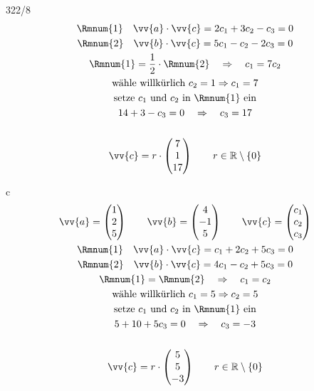\begin{exercise}{322/8}
\begin{gather*}
    \text{\Rmnum{1}} \quad \vv{a} \cdot \vv{c} = 2c_1 + 3c_2 - c_3 = 0 \\
    \text{\Rmnum{2}} \quad \vv{b} \cdot \vv{c} = 5c_1 - c_2 - 2c_3 = 0 \\
    \text{\Rmnum{1}} = \frac{1}{2} \cdot \text{\Rmnum{2}} \quad\Rightarrow\quad c_1 = 7c_2 \\
    \text{wähle willkürlich } c_2 = 1 \Rightarrow c_1 = 7 \\
    \text{setze $c_1$ und $c_2$ in \Rmnum{1} ein} \\
    14 + 3 - c_3 = 0 \quad\Rightarrow\quad c_3 = 17 \\\\
    \vv{c} = r \cdot \begin{pmatrix}7 \\ 1 \\ 17\end{pmatrix} \qquad r \in \mathbb{R} \setminus \{0\}
  \end{gather*}
  \item [c]
  \begin{gather*}
    \vv{a} = \begin{pmatrix}1 \\ 2 \\ 5\end{pmatrix} \qquad \vv{b} = \begin{pmatrix}4 \\ -1 \\ 5\end{pmatrix} \qquad \vv{c} = \begin{pmatrix}c_1 \\ c_2 \\ c_3\end{pmatrix} \\
    \text{\Rmnum{1}} \quad \vv{a} \cdot \vv{c} = c_1 + 2c_2 + 5c_3 = 0 \\
    \text{\Rmnum{2}} \quad \vv{b} \cdot \vv{c} = 4c_1 - c_2 + 5c_3 = 0 \\
    \text{\Rmnum{1}} = \text{\Rmnum{2}} \quad\Rightarrow\quad c_1 = c_2 \\
    \text{wähle willkürlich } c_1 = 5 \Rightarrow c_2 = 5 \\
    \text{setze $c_1$ und $c_2$ in \Rmnum{1} ein} \\
    5 + 10 + 5c_3 = 0 \quad\Rightarrow\quad c_3 = -3 \\\\
  \vv{c} = r \cdot \begin{pmatrix}5 \\ 5 \\ -3\end{pmatrix} \qquad r \in \mathbb{R} \setminus \{0\}
  \end{gather*}
\end{exercise}

